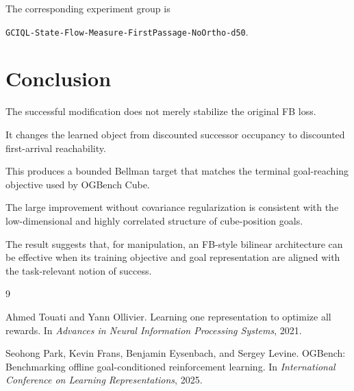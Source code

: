 \documentclass[11pt]{article}
\theoremstyle{remark}
\begin{document}
The corresponding experiment group is

\begin{center}
\texttt{GCIQL-State-Flow-Measure-FirstPassage-NoOrtho-d50}.
\end{center}

\section{Conclusion}

The successful modification does not merely stabilize the original FB loss.

It changes the learned object from discounted successor occupancy to discounted first-arrival reachability.

This produces a bounded Bellman target that matches the terminal goal-reaching objective used by OGBench Cube.

The large improvement without covariance regularization is consistent with the low-dimensional and highly correlated structure of cube-position goals.

The result suggests that, for manipulation, an FB-style bilinear architecture can be effective when its training objective and goal representation are aligned with the task-relevant notion of success.



\begin{thebibliography}{9}

Ahmed Touati and Yann Ollivier.
\newblock Learning one representation to optimize all rewards.
\newblock In \emph{Advances in Neural Information Processing Systems}, 2021.

Seohong Park, Kevin Frans, Benjamin Eysenbach, and Sergey Levine.
\newblock OGBench: Benchmarking offline goal-conditioned reinforcement learning.
\newblock In \emph{International Conference on Learning Representations}, 2025.

\end{thebibliography}
\end{document}
